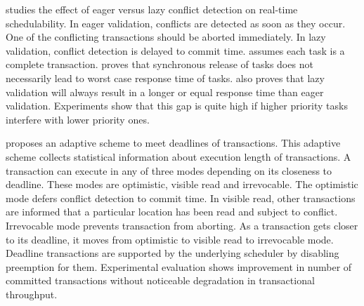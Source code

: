 \cite{5665752} studies the effect of eager versus lazy conflict detection
on real-time schedulability. In eager validation, conflicts are detected
as soon as they occur. One of the conflicting transactions should
be aborted immediately. In lazy validation, conflict detection is
delayed to commit time. \cite{5665752} assumes each task is a complete
transaction. \cite{5665752} proves that synchronous release of tasks
does not necessarily lead to worst case response time of tasks. \cite{5665752}
also proves that lazy validation will always result in a longer or
equal response time than eager validation. Experiments show that this
gap is quite high if higher priority tasks interfere with lower priority
ones.

\cite{5958224}proposes an adaptive scheme to meet deadlines of transactions.
This adaptive scheme collects statistical information about execution
length of transactions. A transaction can execute in any of three
modes depending on its closeness to deadline. These modes are optimistic,
visible read and irrevocable. The optimistic mode defers conflict
detection to commit time. In visible read, other transactions are
informed that a particular location has been read and subject to conflict.
Irrevocable mode prevents transaction from aborting. As a transaction
gets closer to its deadline, it moves from optimistic to visible read
to irrevocable mode. Deadline transactions are supported by the underlying
scheduler by disabling preemption for them. Experimental evaluation
shows improvement in number of committed transactions without noticeable
degradation in transactional throughput.